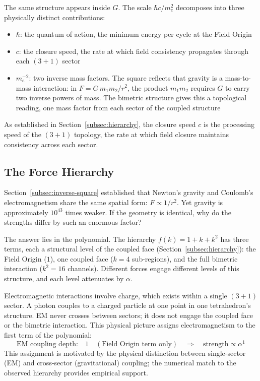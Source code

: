 \documentclass[aps,prd,preprint,superscriptaddress,showpacs,preprintnumbers,amsmath,amssymb,nofootinbib]{revtex4-2}
\begin{document}
The same structure appears inside $G$. The scale $\hbar c / m_e^2$ decomposes into three physically distinct contributions:
\begin{itemize}
\item $\hbar$: the quantum of action, the minimum energy per cycle at the Field Origin
\item $c$: the closure speed, the rate at which field consistency propagates through each $(3+1)$ sector
\item $m_e^{-2}$: two inverse mass factors. The square reflects that gravity is a mass-to-mass interaction: in $F = G\, m_1 m_2 / r^2$, the product $m_1 m_2$ requires $G$ to carry two inverse powers of mass. The bimetric structure gives this a topological reading, one mass factor from each sector of the coupled structure
\end{itemize}

As established in Section~\ref{subsec:hierarchy}, the closure speed $c$ is the processing speed of the $(3+1)$ topology, the rate at which field closure maintains consistency across each sector.

\subsection{The Force Hierarchy}
\label{subsec:hierarchy-eq}

Section~\ref{subsec:inverse-square} established that Newton's gravity and Coulomb's electromagnetism share the same spatial form: $F \propto 1/r^2$. Yet gravity is approximately $10^{43}$ times weaker. If the geometry is identical, why do the strengths differ by such an enormous factor?

The answer lies in the polynomial. The hierarchy $f(k) = 1 + k + k^2$ has three terms, each a structural level of the coupled face (Section~\ref{subsec:hierarchy}): the Field Origin ($1$), one coupled face ($k = 4$ sub-regions), and the full bimetric interaction ($k^2 = 16$ channels). Different forces engage different levels of this structure, and each level attenuates by $\alpha$.

Electromagnetic interactions involve charge, which exists within a single $(3+1)$ sector. A photon couples to a charged particle at one point in one tetrahedron's structure. EM never crosses between sectors; it does not engage the coupled face or the bimetric interaction. This physical picture assigns electromagnetism to the first term of the polynomial:
\begin{equation}
\text{EM coupling depth:} \quad 1 \quad (\text{Field Origin term only}) \quad \Rightarrow \quad \text{strength} \propto \alpha^{1}
\label{eq:em-depth}
\end{equation}
This assignment is motivated by the physical distinction between single-sector (EM) and cross-sector (gravitational) coupling; the numerical match to the observed hierarchy provides empirical support.
\end{document}
